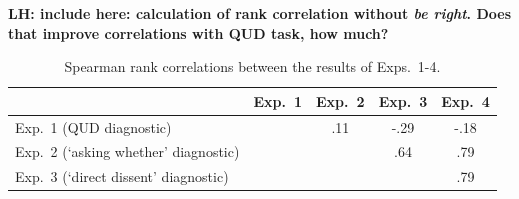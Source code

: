\documentclass[times,linguex,xcolor]{glossa}
\newcommand{\lh}[1]{\textbf{\color{Cerulean}LH: #1}}
\begin{document}
  \lh{include here: calculation of rank correlation without \emph{be right}. Does that improve correlations with QUD task, how much?}

  \begin{table}[ht!]
    \centering
    \begin{tabular}{l | c c c c}
    & Exp.~1 & Exp.~2 & Exp.~3 & Exp.~4 \\ \hline
    Exp.~1 (QUD diagnostic) & \cellcolor{lightgray} & .11 & -.29 & -.18 \\
    Exp.~2 (`asking whether' diagnostic) & \cellcolor{lightgray} & \cellcolor{lightgray} & .64 &.79 \\
    Exp.~3 (`direct dissent' diagnostic) & \cellcolor{lightgray}& \cellcolor{lightgray} & \cellcolor{lightgray} & .79  \\
    \hline
    \end{tabular}
  \caption{Spearman rank correlations between the results of Exps.~1-4.}\label{t:spearman}
  \end{table}
  
\end{document}
